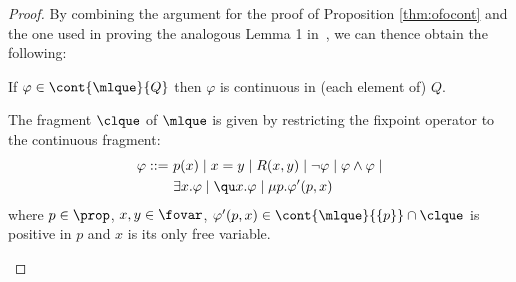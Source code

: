 \begin{proof}
By combining the argument for the proof of Proposition \ref{thm:ofocont} and
the one used in proving the analogous Lemma 1 in~\cite{Fontaine08}, we can thence obtain the following:
\begin{proposition}\label{lem:colqueiscont_mu}
If $\varphi \in \cont{\mlque}{Q}$ then $\varphi$ is continuous in (each element of) $Q$.
\end{proposition}

\begin{definition}
The fragment $\clque$ of $\mlque$ is given by restricting the fixpoint operator to the continuous fragment:
\begin{align*}
\varphi ::=\ & p(x) \mid x=y \mid R(x,y) \mid \lnot\varphi \mid \varphi \land \varphi \mid\\
& \exists x.\varphi \mid \qu x.\varphi \mid \mu p.\varphi'(p,x)
\end{align*}
%
where $p\in\prop$, $x,y\in\fovar$, $\varphi'(p,x) \in \cont{\mlque}{\{p\}} \cap \clque$ is positive in $p$ and $x$ is its only free variable.%
\end{definition}



\end{proof}
